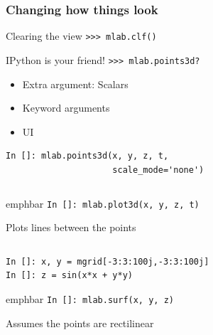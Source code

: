 \documentclass[14pt,compress]{beamer}
\newcommand{\emphbar}[1]
{\begin{beamercolorbox}[rounded=true]{emphbar} 
      {#1}
 \end{beamercolorbox}
}
\newcommand{\myemph}[1]{\structure{\emph{#1}}}
\newcommand{\PythonCode}[1]{\lstinline{#1}}
\begin{document}
\begin{frame}
    \frametitle{Changing how things look}

    \begin{block}{Clearing the view}
    \PythonCode{>>> mlab.clf()}
    \end{block}

    \pause

    \begin{block}{IPython is your friend!}
    \PythonCode{>>> mlab.points3d?}

    \begin{itemize}

        \item Extra argument: Scalars

        \item Keyword arguments

        \item UI
    \end{itemize}
    \end{block}
\pause
    \begin{lstlisting}
In []: mlab.points3d(x, y, z, t, 
                     scale_mode='none')
    \end{lstlisting}

\end{frame}



\begin{frame}[fragile]
  \begin{columns}
        \myemph{\Large 1D data}
  \end{columns}
  \emphbar{\PythonCode{In []: mlab.plot3d(x, y, z, t)}}

    Plots lines between the points
    
\end{frame}

\begin{frame}[fragile]
    \begin{columns}
        \myemph{\Large 2D data}
    \end{columns}            
    \begin{lstlisting}
In []: x, y = mgrid[-3:3:100j,-3:3:100j]
In []: z = sin(x*x + y*y)
    \end{lstlisting}

    \emphbar{\PythonCode{In []: mlab.surf(x, y, z)}}

    \alert{Assumes the points are rectilinear}

\end{frame}
\end{document}
